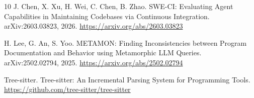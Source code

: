 \documentclass[12pt,a4paper]{article}
\begin{document}
\begin{thebibliography}{10}
J. Chen, X. Xu, H. Wei, C. Chen, B. Zhao.
\newblock SWE-CI: Evaluating Agent Capabilities in Maintaining Codebases via Continuous Integration.
\newblock arXiv:2603.03823, 2026.
\newblock \url{https://arxiv.org/abs/2603.03823}

H. Lee, G. An, S. Yoo.
\newblock METAMON: Finding Inconsistencies between Program Documentation and Behavior using Metamorphic LLM Queries.
\newblock arXiv:2502.02794, 2025.
\newblock \url{https://arxiv.org/abs/2502.02794}

Tree-sitter.
\newblock Tree-sitter: An Incremental Parsing System for Programming Tools.
\newblock \url{https://github.com/tree-sitter/tree-sitter}

\end{thebibliography}
\end{document}
